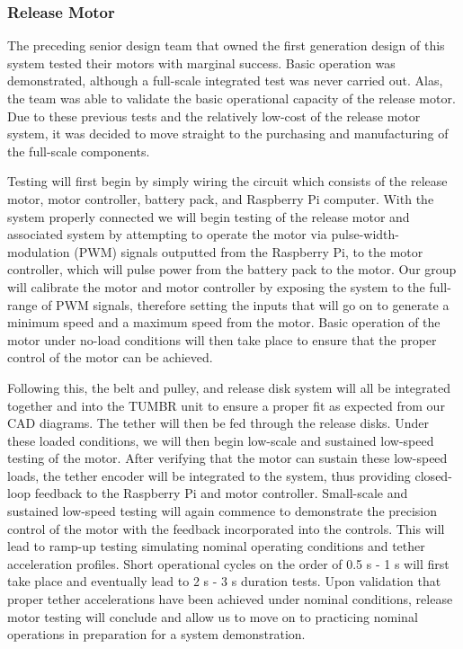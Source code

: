 
\subsubsection{Release Motor\label{sss: ReleaseMotorTesting}}

\indent\indent The preceding senior design team that owned the first generation design of this system tested their motors with marginal success. Basic operation was demonstrated, although a full-scale integrated test was never carried out. Alas, the team was able to validate the basic operational capacity of the release motor. Due to these previous tests and the relatively low-cost of the release motor system, it was decided to move straight to the purchasing and manufacturing of the full-scale components. 

Testing will first begin by simply wiring the circuit which consists of the release motor, motor controller, battery pack, and Raspberry Pi computer. With the system properly connected we will begin testing of the release motor and associated system by attempting to operate the motor via pulse-width-modulation (PWM) signals outputted from the Raspberry Pi, to the motor controller, which will pulse power from the battery pack to the motor. Our group will calibrate the motor and motor controller by exposing the system to the full-range of PWM signals, therefore setting the inputs that will go on to generate a minimum speed and a maximum speed from the motor. Basic operation of the motor under no-load conditions will then take place to ensure that the proper control of the motor can be achieved.

Following this, the belt and pulley, and release disk system will all be integrated together and into the TUMBR unit to ensure a proper fit as expected from our CAD diagrams. The tether will then be fed through the release disks. Under these loaded conditions, we will then begin low-scale and sustained low-speed testing of the motor. After verifying that the motor can sustain these low-speed loads, the tether encoder will be integrated to the system, thus providing closed-loop feedback to the Raspberry Pi and motor controller. Small-scale and sustained low-speed testing will again commence to demonstrate the precision control of the motor with the feedback incorporated into the controls. This will lead to ramp-up testing simulating nominal operating conditions and tether acceleration profiles. Short operational cycles on the order of 0.5 s - 1 s will first take place and eventually lead to 2 s - 3 s duration tests. Upon validation that proper tether accelerations have been achieved under nominal conditions, release motor testing will conclude and allow us to move on to practicing nominal operations in preparation for a system demonstration. 

